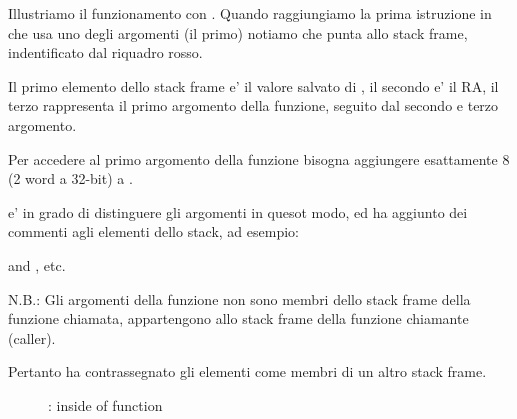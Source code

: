 \myindex{\olly}
Illustriamo il funzionamento con \olly.
Quando raggiungiamo la prima istruzione in \ttf che usa uno degli argomenti (il primo) 
notiamo che \EBP punta allo \gls{stack frame}, indentificato dal riquadro rosso.

Il primo elemento dello \gls{stack frame} e' il valore salvato di \EBP, 
il secondo e' il \ac{RA}, il terzo rappresenta il primo argomento della funzione, seguito dal secondo e terzo argomento.

Per accedere al primo argomento della funzione bisogna aggiungere esattamente 8 (2 word a 32-bit) a \EBP.

\olly e' in grado di distinguere gli argomenti in quesot modo, ed ha aggiunto dei commenti agli elementi dello stack, ad esempio:

 and , etc.

N.B.: Gli argomenti della funzione non sono membri dello stack frame della funzione chiamata, appartengono allo stack frame della
funzione chiamante (\gls{caller}).

Pertanto \olly ha contrassegnato gli elementi  come membri di un altro stack frame.

\begin{figure}[H]
\centering
{}
\caption{\olly: inside of \ttf{} function}
\label{fig:passing_arguments_olly}
\end{figure}
